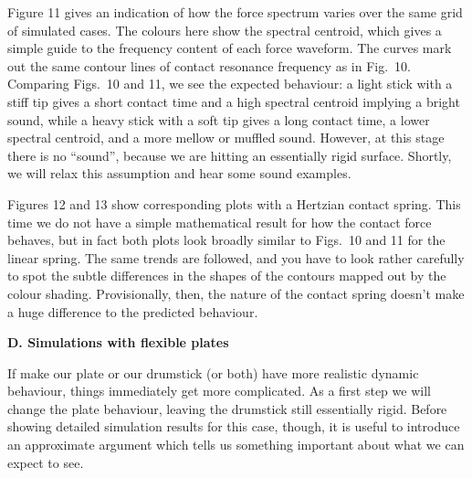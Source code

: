   Figure 11 gives an indication of how the force spectrum varies over the same 
  grid of simulated cases. The colours here show the spectral centroid, which 
  gives a simple guide to the frequency content of each force waveform. The 
  curves mark out the same contour lines of contact resonance frequency as in 
  Fig.\ 10. Comparing Figs.\ 10 and 11, we see the expected behaviour: a light 
  stick with a stiff tip gives a short contact time and a high spectral 
  centroid implying a bright sound, while a heavy stick with a soft tip gives a 
  long contact time, a lower spectral centroid, and a more mellow or muffled 
  sound. However, at this stage there is no ``sound'', because we are hitting 
  an essentially rigid surface. Shortly, we will relax this assumption and hear 
  some sound examples. 


  Figures 12 and 13 show corresponding plots with a Hertzian contact spring. 
  This time we do not have a simple mathematical result for how the contact 
  force behaves, but in fact both plots look broadly similar to Figs.\ 10 and 
  11 for the linear spring. The same trends are followed, and you have to look 
  rather carefully to spot the subtle differences in the shapes of the contours 
  mapped out by the colour shading. Provisionally, then, the nature of the 
  contact spring doesn’t make a huge difference to the predicted behaviour. 



  \textbf{D. Simulations with flexible plates} 

  If make our plate or our drumstick (or both) have more realistic dynamic 
  behaviour, things immediately get more complicated. As a first step we will 
  change the plate behaviour, leaving the drumstick still essentially rigid. 
  Before showing detailed simulation results for this case, though, it is 
  useful to introduce an approximate argument which tells us something 
  important about what we can expect to see. 

